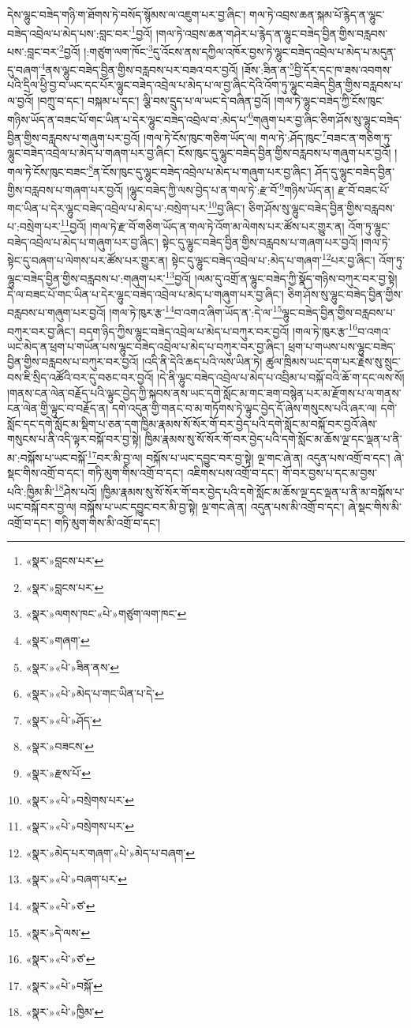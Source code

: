 དེས་ལྷུང་བཟེད་གཉི་ག་ཐོགས་ཏེ་བསོད་སྙོམས་ལ་འཇུག་པར་བྱ་ཞིང་། གལ་ཏེ་འབྲས་ཆན་སྐམ་པོ་རྙེད་ན་ལྷུང་བཟེད་འབྲེལ་པ་མེད་པས་:བླང་བར་\footnote{«སྣར་»བླངས་པར་}བྱའོ། །གལ་ཏེ་འབྲས་ཆན་གཤེར་པ་རྙེད་ན་ལྷུང་བཟེད་བྱིན་གྱིས་བརླབས་པས་:བླང་བར་\footnote{«སྣར་»བླངས་པར་}བྱའོ། །:གཙུག་ལག་ཁོང་\footnote{«སྣར་»ལགས་ཁང་«པེ་»གཙུག་ལག་ཁང་}དུ་འོངས་ནས་དཀྱིལ་འཁོར་བྱས་ཏེ་ལྷུང་བཟེད་འབྲེལ་པ་མེད་པ་མདུན་དུ་བཞག་\footnote{«སྣར་»གཞག་}ནས་ལྷུང་བཟེད་བྱིན་གྱིས་བརླབས་པར་བཟའ་བར་བྱའོ། །ཟོས་:ཟིན་ན་\footnote{«སྣར་»«པེ་»ཟིན་ནས་}བྱི་དོར་དང་ཁ་ཟས་འབགས་པའི་དྲིལ་ཕྱི་བྱ་བ་ཡང་དང་པོར་ལྷུང་བཟེད་འབྲེལ་པ་མེད་པ་ལ་བྱ་ཞིང་དེའི་འོག་ཏུ་ལྷུང་བཟེད་བྱིན་གྱིས་བརླབས་པ་ལ་བྱའོ། །བཀྲུ་བ་དང་། བསྐམ་པ་དང་། ལྕི་བས་དྲུད་པ་ལ་ཡང་དེ་བཞིན་བྱའོ། །གལ་ཏེ་ལྷུང་བཟེད་ཀྱི་ངོས་ཁུང་གཉིས་ཡོད་ན་བཟང་པོ་གང་ཡིན་པ་དེར་ལྷུང་བཟེད་འབྲེལ་བ་:མེད་པ་\footnote{«སྣར་»«པེ་»མེད་པ་གང་ཡིན་པ་དེ་}གཞུག་པར་བྱ་ཞིང་ཅིག་ཤོས་སུ་ལྷུང་བཟེད་བྱིན་གྱིས་བརླབས་པ་གཞུག་པར་བྱའོ། །གལ་ཏེ་ངོས་ཁུང་གཅིག་ཡོད་ལ། གལ་ཏེ་:ཤོད་ཁུང་\footnote{«སྣར་»«པེ་»ཤོད་}བཟང་ན་གཅིག་ཏུ་ལྷུང་བཟེད་འབྲེལ་པ་མེད་པ་གཞག་པར་བྱ་ཞིང་། ངོས་ཁུང་དུ་ལྷུང་བཟེད་བྱིན་གྱིས་བརླབས་པ་གཞུག་པར་བྱའོ། །གལ་ཏེ་ངོས་ཁུང་བཟང་\footnote{«སྣར་»བཟངས་}ན་ངོས་ཁུང་དུ་ལྷུང་བཟེད་འབྲེལ་པ་མེད་པ་གཞུག་པར་བྱ་ཞིང་། ཤོད་དུ་ལྷུང་བཟེད་བྱིན་གྱིས་བརླབས་པ་གཞག་པར་བྱའོ། །ལྷུང་བཟེད་ཀྱི་ལས་བྱེད་པ་ན་གལ་ཏེ་:རྫ་བོ་\footnote{«སྣར་»རྫས་པོ་}གཉིས་ཡོད་ན། རྫ་བོ་བཟང་པོ་གང་ཡིན་པ་དེར་ལྷུང་བཟེད་འབྲེལ་པ་མེད་པ་:བསྲེག་པར་\footnote{«སྣར་»«པེ་»བསྲེགས་པར་}བྱ་ཞིང་། ཅིག་ཤོས་སུ་ལྷུང་བཟེད་བྱིན་གྱིས་བརླབས་པ་:བསྲེག་པར་\footnote{«སྣར་»«པེ་»བསྲེགས་པར་}བྱའོ། །གལ་ཏེ་རྫ་བོ་གཅིག་ཡོད་ན་གལ་ཏེ་འོག་མ་ལེགས་པར་ཚོས་པར་གྱུར་ན། འོག་ཏུ་ལྷུང་བཟེད་འབྲེལ་པ་མེད་པ་གཞུག་པར་བྱ་ཞིང་། སྟེང་དུ་ལྷུང་བཟེད་བྱིན་གྱིས་བརླབས་པ་གཞག་པར་བྱའོ། །གལ་ཏེ་སྟེང་དུ་བཞག་པ་ལེགས་པར་ཚོས་པར་གྱུར་ན། སྟེང་དུ་ལྷུང་བཟེད་འབྲེལ་པ་:མེད་པ་གཞག་\footnote{«སྣར་»མེད་པར་གཞག་«པེ་»མེད་པ་བཞག་}པར་བྱ་ཞིང་། འོག་ཏུ་ལྷུང་བཟེད་བྱིན་གྱིས་བརླབས་པ་:གཞུག་པར་\footnote{«སྣར་»«པེ་»བཞག་པར་}བྱའོ། །ལམ་དུ་འགྲོ་ན་ལྷུང་བཟེད་ཀྱི་སྣོད་གཉིས་བཀུར་བར་བྱ་སྟེ། དེ་ལ་བཟང་པོ་གང་ཡིན་པ་དེར་ལྷུང་བཟེད་འབྲེལ་པ་མེད་པ་གཞུག་པར་བྱ་ཞིང་། ཅིག་ཤོས་སུ་ལྷུང་བཟེད་བྱིན་གྱིས་བརླབས་པ་གཞུག་པར་བྱའོ། །གལ་ཏེ་ཁུར་རྩ་\footnote{«སྣར་»«པེ་»ཙ་}བ་འགའ་ཞིག་ཡོད་ན་:དེ་ལ་\footnote{«སྣར་»དེ་ལས་}ལྷུང་བཟེད་བྱིན་གྱིས་བརླབས་པ་བཀུར་བར་བྱ་ཞིང་། བདག་ཉིད་ཀྱིས་ལྷུང་བཟེད་འབྲེལ་པ་མེད་པ་བཀུར་བར་བྱའོ། །གལ་ཏེ་ཁུར་རྩ་\footnote{«སྣར་»«པེ་»ཙ་}བ་འགའ་ཡང་མེད་ན་ཕྲག་པ་གཡོན་པས་ལྷུང་བཟེད་འབྲེལ་པ་མེད་པ་བཀུར་བར་བྱ་ཞིང་། ཕྲག་པ་གཡས་པས་ལྷུང་བཟེད་བྱིན་གྱིས་བརླབས་པ་བཀུར་བར་བྱའོ། །འདི་ནི་དེའི་ཆད་པའི་ལས་ཡིན་ཏེ། ཚུལ་ཁྲིམས་ཡང་དག་པར་རྗེས་སུ་སྲུང་བས་ཇི་སྲིད་འཚོའི་བར་དུ་བཅང་བར་བྱའོ། །དེ་ནི་ལྷུང་བཟེད་འབྲེལ་པ་མེད་པ་འབྲིམ་པ་བསྐོ་བའི་ཆོ་ག་དང་ལས་སོ། །གནས་ངན་ལེན་བརྗོད་པའི་ལྟུང་བྱེད་ཀྱི་སྐབས་ནས་ཡང་དགེ་སློང་མ་གང་ཟག་བསྙེན་པར་མ་རྫོགས་པ་ལ་གནས་ངན་ལེན་གྱི་ལྟུང་བ་བརྗོད་ན། དགེ་འདུན་གྱི་གནང་བ་མ་གཏོགས་ཏེ་ལྟུང་བྱེད་དོ་ཞེས་གསུངས་པའི་ཞར་ལ། དགེ་སློང་དང་དགེ་སློང་མ་སྡིག་པ་ཅན་དག་ཁྱིམ་རྣམས་སོ་སོར་གོ་བར་བྱེད་པའི་དགེ་སློང་མ་བསྐོ་བར་བྱའོ་ཞེས་གསུངས་པ་ནི་འདི་ལྟར་བསྐོ་བར་བྱ་སྟེ། ཁྱིམ་རྣམས་སུ་སོ་སོར་གོ་བར་བྱེད་པའི་དགེ་སློང་མ་ཆོས་ལྔ་དང་ལྡན་པ་ནི་མ་:བསྐོས་པ་ཡང་བསྐོ་\footnote{«སྣར་»«པེ་»བསྐོ་}བར་མི་བྱ་ལ། བསྐོས་པ་ཡང་དབྱུང་བར་བྱ་སྟེ། ལྔ་གང་ཞེ་ན། འདུན་པས་འགྲོ་བ་དང་། ཞེ་སྡང་གིས་འགྲོ་བ་དང་། གཏི་མུག་གིས་འགྲོ་བ་དང་། འཇིགས་པས་འགྲོ་བ་དང་། གོ་བར་བྱས་པ་དང་མ་བྱས་པའི་:ཁྱིམ་མི་\footnote{«སྣར་»«པེ་»ཁྱིམ་}ཤེས་པའོ། །ཁྱིམ་རྣམས་སུ་སོ་སོར་གོ་བར་བྱེད་པའི་དགེ་སློང་མ་ཆོས་ལྔ་དང་ལྡན་པ་ནི་མ་བསྐོས་པ་ཡང་བསྐོ་བར་བྱ་ལ། བསྐོས་པ་ཡང་དབྱུང་བར་མི་བྱ་སྟེ། ལྔ་གང་ཞེ་ན། འདུན་པས་མི་འགྲོ་བ་དང་། ཞེ་སྡང་གིས་མི་འགྲོ་བ་དང་། གཏི་མུག་གིས་མི་འགྲོ་བ་དང་། 